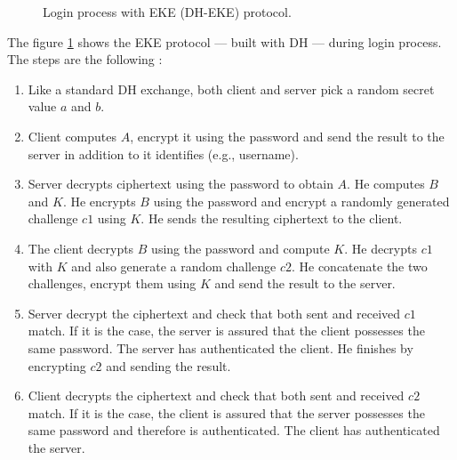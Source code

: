 ﻿\documentclass[../report.tex]{subfiles}
\begin{document}
\begin{figure}[h]
 \centering
 \setlength{\fboxsep}{10pt}
 \setlength{\fboxrule}{1pt}
 \caption{Login process with EKE (DH-EKE) protocol.}
 \label{fig:EKE_DH}
\end{figure}
The figure \ref{fig:EKE_DH} shows the EKE protocol --- built with DH ---  during login process.
The steps are the following :
\begin{enumerate}
 \item Like a standard DH exchange, both client and server pick a random secret value $a$ and $b$.
 \item Client computes $A$, encrypt it using the password and send the result to the server in addition to it identifies (e.g., username).
 \item Server decrypts ciphertext using the password to obtain $A$. He computes $B$ and $K$. He encrypts $B$ using the password and encrypt a randomly generated challenge $c1$ using $K$. He sends the resulting ciphertext to the client.
 \item The client decrypts $B$ using the password and compute $K$. He decrypts $c1$ with $K$ and also generate a random challenge $c2$. He concatenate the two challenges, encrypt them using $K$ and send the result to the server.
 \item Server decrypt the ciphertext and check that both sent and received $c1$ match. If it is the case, the server is assured that the client possesses the same password. The server has authenticated the client. He finishes by encrypting $c2$ and sending the result.
 \item Client decrypts the ciphertext and check that both sent and received $c2$ match. If it is the case, the client is assured that the server possesses the same password and therefore is authenticated. The client has authenticated the server.
\end{enumerate}
\end{document}
